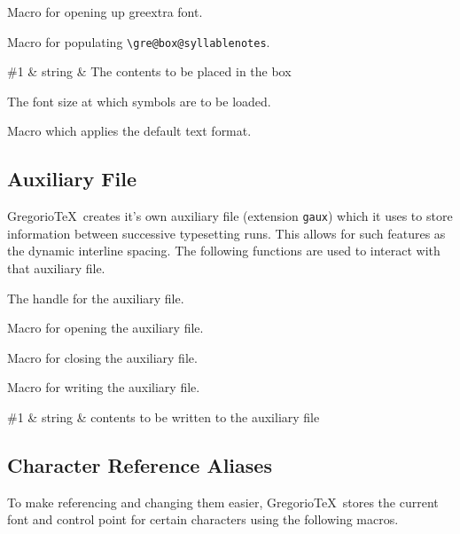 Macro for opening up greextra font.

Macro for populating \verb=\gre@box@syllablenotes=.

\begin{argtable}
  \#1 & string & The contents to be placed in the box\\
\end{argtable}

The font size at which symbols are to be loaded.

Macro which applies the default text format.


\subsection{Auxiliary File}
Gregorio\TeX\ creates it's own auxiliary file (extension \texttt{gaux}) which it uses to store information between successive typesetting runs.  This allows for such features as the dynamic interline spacing.  The following functions are used to interact with that auxiliary file.

The handle for the auxiliary file.

Macro for opening the auxiliary file.

Macro for closing the auxiliary file.

Macro for writing the auxiliary file.

\begin{argtable}
  \#1 & string & contents to be written to the auxiliary file\\
\end{argtable}



\subsection{Character Reference Aliases}
To make referencing and changing them easier, Gregorio\TeX\ stores the current font and control point for certain characters using the following macros.

